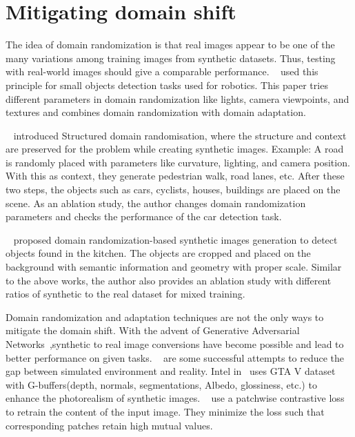 \section{Mitigating domain shift}\label{sec:mitigating_domain_shift}

The idea of domain randomization is that real images appear to be one of the many variations among training images from synthetic datasets.
Thus, testing with real-world images should give a comparable performance.
~\cite{tobin2017domain} used this principle for small objects detection tasks used for robotics.
This paper tries different parameters in domain randomization like lights, camera viewpoints, and textures and combines domain randomization with domain adaptation.

~\cite{prakash2020structured} introduced Structured domain randomisation, where the structure and context are preserved for the problem while creating synthetic images.
Example: A road is randomly placed with parameters like curvature, lighting, and camera position.
With this as context, they generate pedestrian walk, road lanes, etc.
After these two steps, the objects such as cars, cyclists, houses, buildings are placed on the scene.
As an ablation study, the author changes domain randomization parameters and checks the performance of the car detection task.

~\cite{georgakis2017synthesizing} proposed domain randomization-based synthetic images generation to detect objects found in the kitchen.
The objects are cropped and placed on the background with semantic information and geometry with proper scale.
Similar to the above works, the author also provides an ablation study with different ratios of synthetic to the real dataset for mixed training.

Domain randomization and adaptation techniques are not the only ways to mitigate the domain shift.
With the advent of Generative Adversarial Networks~\cite{Goodfellow2014GenerativeAN},synthetic to real image conversions have become possible and lead to better performance on given tasks.
~\cite{Richter_2021, CycleGAN2017, park2020cut,isola2017image, dundar2018domain,Wang2018HighResolutionIS} are some successful attempts to reduce the gap between simulated environment and reality.
Intel in~\cite{Richter_2021} uses GTA V dataset with G-buffers(depth, normals, segmentations, Albedo, glossiness, etc.) to enhance the photorealism of synthetic images.
~\cite{park2020cut} use a patchwise contrastive loss to retrain the content of the input image.
They minimize the loss such that corresponding patches retain high mutual values.

